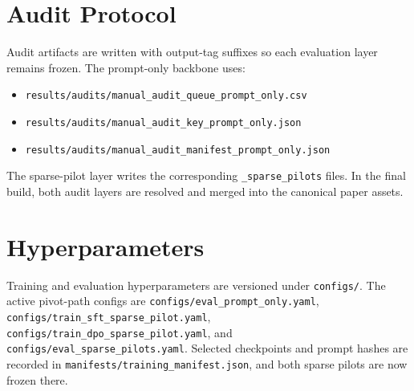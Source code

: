 \documentclass[11pt]{article}
\begin{document}
\begin{table}[t]
\centering
\resizebox{\linewidth}{!}{}
\caption{Compact per-stem held-out results table from the final audited outputs.}
\end{table}

\section{Audit Protocol}
Audit artifacts are written with output-tag suffixes so each evaluation layer remains frozen. The prompt-only backbone uses:
\begin{itemize}[leftmargin=*]
\item \texttt{results/audits/manual\_audit\_queue\_prompt\_only.csv}
\item \texttt{results/audits/manual\_audit\_key\_prompt\_only.json}
\item \texttt{results/audits/manual\_audit\_manifest\_prompt\_only.json}
\end{itemize}
The sparse-pilot layer writes the corresponding \texttt{\_sparse\_pilots} files. In the final build, both audit layers are resolved and merged into the canonical paper assets.

\section{Hyperparameters}
Training and evaluation hyperparameters are versioned under \texttt{configs/}. The active pivot-path configs are \texttt{configs/eval\_prompt\_only.yaml}, \texttt{configs/train\_sft\_sparse\_pilot.yaml}, \texttt{configs/train\_dpo\_sparse\_pilot.yaml}, and \texttt{configs/eval\_sparse\_pilots.yaml}. Selected checkpoints and prompt hashes are recorded in \texttt{manifests/training\_manifest.json}, and both sparse pilots are now frozen there.
\end{document}
